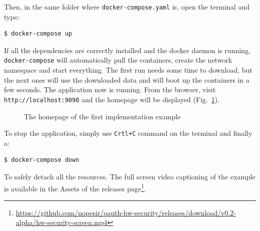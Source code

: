 \newpage

\noindent Then, in the same folder where \texttt{docker-compose.yaml} is, open the terminal and type:
\begin{lstlisting}[language=bash]
  $ docker-compose up
\end{lstlisting}

\noindent If all the dependencies are correctly installed and the docker daemon is running, \texttt{docker-compose} will automatically pull the containers, create the network namespace and start everything. The first run needs some time to download, but the next ones will use the downloaded data and will boot up the containers in a few seconds. The application now is running. From the browser, visit \texttt{http://localhost:9090} and the homepage will be displayed (Fig.~\ref{fig:home1}).

\begin{figure}[h!]
    \centering
    
    \caption{The homepage of the first implementation example}
    \label{fig:home1}
\end{figure}

\noindent To stop the application, simply use \texttt{Crtl+C} command on the terminal and finally a:
\begin{lstlisting}[language=bash]
  $ docker-compose down
\end{lstlisting}

\noindent To safely detach all the resources.
The full screen video captioning of the example is available in the Assets of the releases page\footnote{\scriptsize{\url{https://github.com/nopesir/oauth-hw-security/releases/download/v0.2-alpha/hw-security-screen.mp4}}}. 

